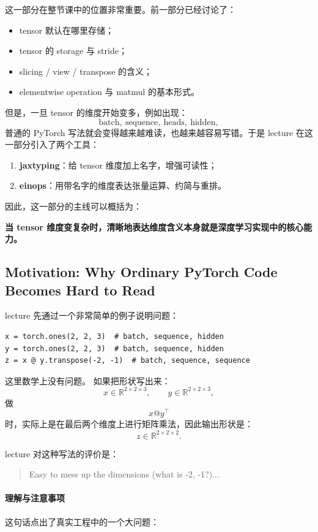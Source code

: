 \documentclass[a4paper,UTF8]{article}
\numberwithin{equation}{section}
\begin{document}
这一部分在整节课中的位置非常重要。前一部分已经讨论了：
\begin{itemize}
    \item tensor 默认在哪里存储；
    \item tensor 的 storage 与 stride；
    \item slicing / view / transpose 的含义；
    \item elementwise operation 与 matmul 的基本形式。
\end{itemize}

但是，一旦 tensor 的维度开始变多，例如出现：
\[
\text{batch},\ \text{sequence},\ \text{heads},\ \text{hidden},
\]
普通的 PyTorch 写法就会变得越来越难读，也越来越容易写错。于是 lecture 在这一部分引入了两个工具：
\begin{enumerate}
    \item \textbf{jaxtyping}：给 tensor 维度加上名字，增强可读性；
    \item \textbf{einops}：用带名字的维度表达张量运算、约简与重排。
\end{enumerate}

因此，这一部分的主线可以概括为：
\begin{center}
\textbf{当 tensor 维度变复杂时，清晰地表达维度含义本身就是深度学习实现中的核心能力。}
\end{center}

\subsection{Motivation: Why Ordinary PyTorch Code Becomes Hard to Read}

lecture 先通过一个非常简单的例子说明问题：
\begin{verbatim}
x = torch.ones(2, 2, 3)  # batch, sequence, hidden
y = torch.ones(2, 2, 3)  # batch, sequence, hidden
z = x @ y.transpose(-2, -1)  # batch, sequence, sequence
\end{verbatim}

这里数学上没有问题。  
如果把形状写出来：
\[
x \in \mathbb{R}^{2 \times 2 \times 3},\qquad
y \in \mathbb{R}^{2 \times 2 \times 3},
\]
做
\[
x @ y^{\top}
\]
时，实际上是在最后两个维度上进行矩阵乘法，因此输出形状是：
\[
z \in \mathbb{R}^{2 \times 2 \times 2}.
\]

lecture 对这种写法的评价是：
\begin{quote}
Easy to mess up the dimensions (what is -2, -1?)...
\end{quote}

\paragraph{理解与注意事项}
这句话点出了真实工程中的一个大问题：
\end{document}
